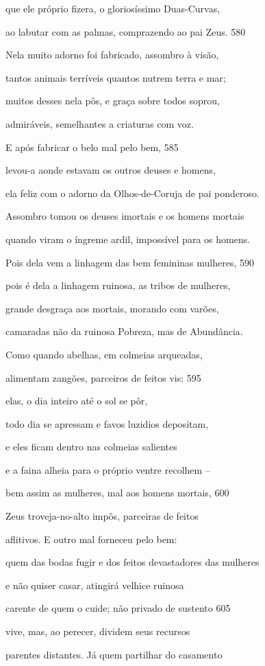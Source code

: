 que ele próprio fizera, o gloriosíssimo Duas-Curvas,

ao labutar com as palmas, comprazendo ao pai Zeus. \num{580}

Nela muito adorno foi fabricado, assombro à visão,

tantos animais terríveis quantos nutrem terra e mar;

muitos desses nela pôs, e graça sobre todos soprou,

admiráveis, semelhantes a criaturas com voz.

\quad{}E após fabricar o belo mal pelo bem, \num{585}

levou-a aonde estavam os outros deuses e homens,

ela feliz com o adorno da Olhos-de-Coruja de pai ponderoso.

Assombro tomou os deuses imortais e os homens mortais

quando viram o íngreme ardil, impossível para os homens.

Pois dela vem a linhagem das bem femininas mulheres, \num{590}

pois é dela a linhagem ruinosa, as tribos de mulheres,

grande desgraça aos mortais, morando com varões,

camaradas não da ruinosa Pobreza, mas de Abundância.

Como quando abelhas, em colmeias arqueadas,

alimentam zangões, parceiros de feitos vis: \num{595}

elas, o dia inteiro até o sol se pôr,

todo dia se apressam e favos luzidios depositam,

e eles ficam dentro nas colmeias salientes

e a faina alheia para o próprio ventre recolhem --

bem assim as mulheres, mal aos homens mortais, \num{600}

Zeus troveja-no-alto impôs, parceiras de feitos

aflitivos. E outro mal forneceu pelo bem:

quem das bodas fugir e dos feitos devastadores das mulheres

e não quiser casar, atingirá velhice ruinosa

carente de quem o cuide; não privado de sustento \num{605}

vive, mas, ao perecer, dividem seus recursos

parentes distantes. Já quem partilhar do casamento

